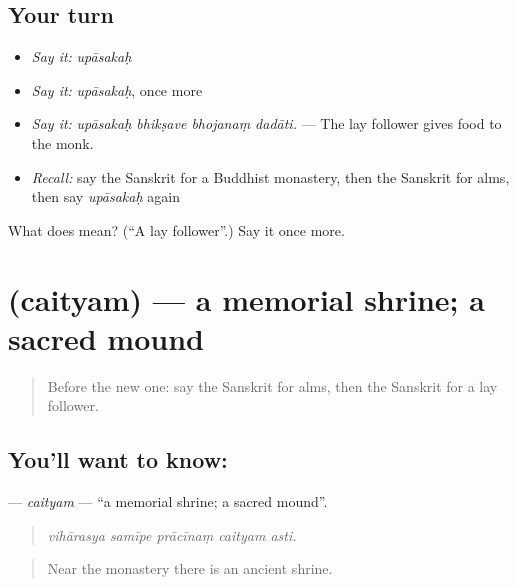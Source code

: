 \subsection*{Your turn}
\begin{itemize}
\raggedright
  \item \emph{Say it:} \emph{upāsakaḥ}
  \item \emph{Say it:} \emph{upāsakaḥ}, once more
  \item \emph{Say it:} \emph{upāsakaḥ bhikṣave bhojanaṃ dadāti.} — The lay follower gives food to the monk.
  \item \emph{Recall:} say the Sanskrit for a Buddhist monastery, then the Sanskrit for alms, then say \emph{upāsakaḥ} again
\end{itemize}

\begin{tcolorbox}[breakable,colback=teal!4,colframe=teal!35!black,title={Before you move on}]
What does  mean? (\textquotedblleft{}A lay follower\textquotedblright{}.) Say it once more.
\end{tcolorbox}
\section[\texorpdfstring{\sk{चैत्यम्} (caityam)}{चैत्यम् (caityam)}]{ (caityam) — a memorial shrine; a sacred mound}

\label{lesson:SA-C401-caityam}



\begin{quote}
Before the new one: say the Sanskrit for alms, then the Sanskrit for a lay follower.
\end{quote}

\subsection*{You'll want to know: }
\textbf{} — \emph{caityam} — \textquotedblleft{}a memorial shrine; a sacred mound\textquotedblright{}.

\begin{quote}
    
\end{quote}

\begin{quote}
\emph{vihārasya samīpe prācīnaṃ caityam asti.}
\end{quote}

\begin{quote}
Near the monastery there is an ancient shrine.
\end{quote}

